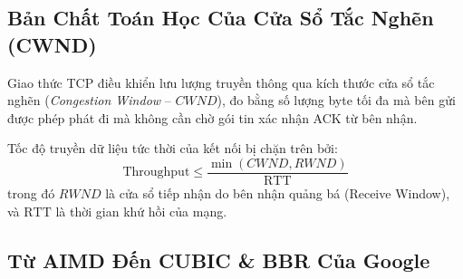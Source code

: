 \subsection{Bản Chất Toán Học Của Cửa Sổ Tắc Nghẽn (CWND)}
Giao thức TCP điều khiển lưu lượng truyền thông qua kích thước cửa sổ tắc nghẽn (\textit{Congestion Window} -- $CWND$), đo bằng số lượng byte tối đa mà bên gửi được phép phát đi mà không cần chờ gói tin xác nhận ACK từ bên nhận.

Tốc độ truyền dữ liệu tức thời của kết nối bị chặn trên bởi:
\begin{equation}
\text{Throughput} \le \frac{\min(CWND, RWND)}{\text{RTT}}
\end{equation}
trong đó $RWND$ là cửa sổ tiếp nhận do bên nhận quảng bá (Receive Window), và $\text{RTT}$ là thời gian khứ hồi của mạng.

\subsection{Từ AIMD Đến CUBIC \& BBR Của Google}

